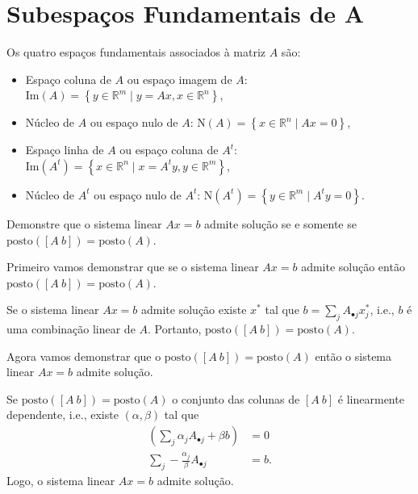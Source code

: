 \documentclass[a4paper,12pt, leqno, answers]{exam}
\newcommand{\mdot}{\bullet}
\newcommand{\EI}{\text{Im}}
\newcommand{\EN}{\text{N}}
\newcommand{\posto}{\text{posto}}
\begin{document}
\begin{questions}
\begin{parts}
\begin{solution}
        \end{solution}
    \end{parts}

    \section*{Subespa\c{c}os Fundamentais de A}
    Os quatro espa\c{c}os fundamentais associados \`{a} matriz $A$ s\~{a}o:
    \begin{itemize}
        \item Espa\c{c}o coluna de $A$ ou espa\c{c}o imagem de $A$: $\EI (A) = \left\{ y \in \mathbb{R}^m \mid y = A x, x \in \mathbb{R}^n \right\}$,
        \item N\'{u}cleo de $A$ ou espa\c{c}o nulo de $A$: $\EN (A) = \left\{ x \in \mathbb{R}^n \mid A x = 0 \right\}$,
        \item Espa\c{c}o linha de $A$ ou espa\c{c}o coluna de $A^t$: $\EI (A^t) = \left\{ x \in \mathbb{R}^n \mid x = A^t y , y \in \mathbb{R}^m \right\}$,
        \item N\'{u}cleo de $A^t$ ou espa\c{c}o nulo de $A^t$: $\EN (A^t) = \left\{ y \in \mathbb{R}^m \mid A^t y = 0 \right\}$.
    \end{itemize}

    \question Demonstre que o sistema linear $A x = b$ admite solu\c{c}\~{a}o se e somente se $\posto ([A \ b]) = \posto (A)$.
    \begin{solution}
        Primeiro vamos demonstrar que se o sistema linear $A x = b$ admite solu\c{c}\~{a}o ent\~{a}o $\posto ([A \ b]) = \posto (A)$.

        Se o sistema linear $A x = b$ admite solu\c{c}\~{a}o existe $x^*$ tal que $b = \sum_j A_{\mdot j} x^*_j$, i.e., $b$ \'{e} uma combina\c{c}\~{a}o linear de $A$. Portanto, $\posto ([A \ b]) = \posto (A)$.

        Agora vamos demonstrar que o $\posto ([A \ b]) = \posto (A)$ ent\~{a}o o sistema linear $A x = b$ admite solu\c{c}\~{a}o.

        Se $\posto ([A \ b]) = \posto (A)$ o conjunto das colunas de $[A \ b]$ \'{e} linearmente dependente, i.e., existe $(\alpha, \beta)$ tal que
        \begin{align*}
            \left( \sum_j \alpha_j A_{\mdot j} + \beta b \right) &= 0 \\
            \sum_j - \frac{\alpha_j}{\beta} A_{\mdot j} &= b.
        \end{align*}
        Logo, o sistema linear $A x = b$ admite solu\c{c}\~{a}o.
    \end{solution}


\end{questions}
\end{document}

